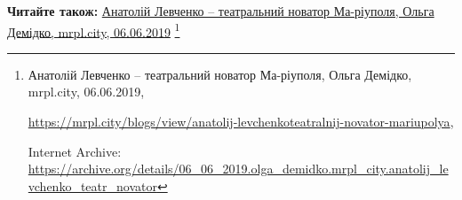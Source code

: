  
 
 
 
 

\def\pubIA{https://archive.org/details/06_06_2019.olga_demidko.mrpl_city.anatolij_levchenko_teatr_novator}
\def\pubTitle{Анатолій Левченко – театральний новатор Ма\hyp{}ріуполя}
\def\pubDate{06.06.2019}
\def\pubOrigin{https://mrpl.city/blogs/view/anatolij-levchenkoteatralnij-novator-mariupolya}
\def\pubAuthor{Ольга Демідко}

\textbf{Читайте також:} \href{\pubIA}{%
\pubTitle, \pubAuthor, mrpl.city, \pubDate}%
\footnote{\pubTitle, \pubAuthor, mrpl.city, \pubDate, \par\url{\pubOrigin}, \par Internet Archive: \url{\pubIA}}
